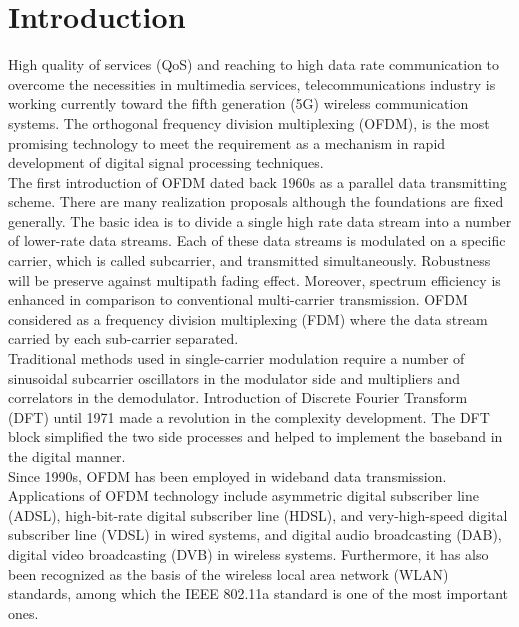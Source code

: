 \chapter{Introduction}
\label{sec:chapter_1}

High quality of services (QoS) and reaching to high data rate communication to overcome the necessities in multimedia services, telecommunications industry is working currently toward the fifth generation (5G) wireless communication systems. The orthogonal frequency division multiplexing (OFDM), is the most promising technology to meet the requirement as a mechanism in rapid development of digital signal processing techniques. \cite{hanzo}\\

The first introduction of OFDM dated back 1960s as a parallel data transmitting scheme. There are many realization proposals although the foundations are fixed generally. The basic idea is to divide a single high rate data stream into a number of lower-rate data streams. Each of these data streams is modulated on a specific carrier, which is called 
subcarrier, and transmitted simultaneously. Robustness will be preserve against multipath fading effect. Moreover, spectrum efficiency is enhanced in comparison to conventional multi-carrier transmission. OFDM considered as a frequency division multiplexing (FDM) where the data stream carried by each sub-carrier separated. \cite{xiong}\\

Traditional methods used in single-carrier modulation require a number of sinusoidal subcarrier oscillators in the modulator side and multipliers and correlators in the demodulator. Introduction of Discrete Fourier Transform (DFT) until 1971 made a revolution in the complexity development. The DFT block simplified the two side processes and helped to implement the baseband in the digital manner.\\
Since 1990s, OFDM has been employed in wideband data transmission. Applications of OFDM technology include asymmetric digital subscriber line (ADSL), high-bit-rate digital subscriber line (HDSL), and very-high-speed digital subscriber line (VDSL) in wired systems, and digital audio broadcasting (DAB), digital video broadcasting (DVB) in wireless systems. Furthermore, it has also been recognized as the basis of the wireless local area network (WLAN) standards, among which the IEEE 802.11a standard is one of the most important ones.\\

